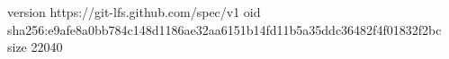version https://git-lfs.github.com/spec/v1
oid sha256:e9afe8a0bb784c148d1186ae32aa6151b14fd11b5a35ddc36482f4f01832f2bc
size 22040
